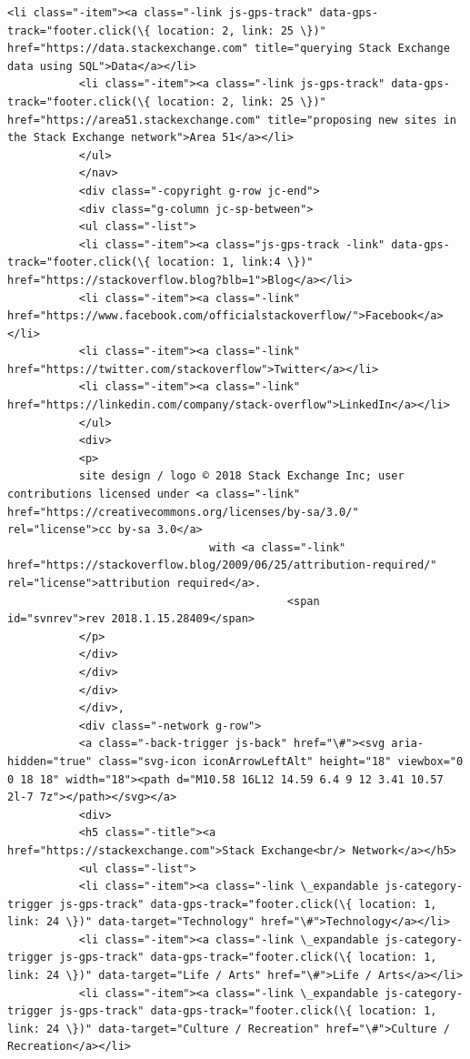 \documentclass[11pt]{article}
\begin{document}
\begin{Verbatim}[commandchars=\\\{\}]
           <li class="-item"><a class="-link js-gps-track" data-gps-track="footer.click(\{ location: 2, link: 25 \})" href="https://data.stackexchange.com" title="querying Stack Exchange data using SQL">Data</a></li>
           <li class="-item"><a class="-link js-gps-track" data-gps-track="footer.click(\{ location: 2, link: 25 \})" href="https://area51.stackexchange.com" title="proposing new sites in the Stack Exchange network">Area 51</a></li>
           </ul>
           </nav>
           <div class="-copyright g-row jc-end">
           <div class="g-column jc-sp-between">
           <ul class="-list">
           <li class="-item"><a class="js-gps-track -link" data-gps-track="footer.click(\{ location: 1, link:4 \})" href="https://stackoverflow.blog?blb=1">Blog</a></li>
           <li class="-item"><a class="-link" href="https://www.facebook.com/officialstackoverflow/">Facebook</a></li>
           <li class="-item"><a class="-link" href="https://twitter.com/stackoverflow">Twitter</a></li>
           <li class="-item"><a class="-link" href="https://linkedin.com/company/stack-overflow">LinkedIn</a></li>
           </ul>
           <div>
           <p>
           site design / logo © 2018 Stack Exchange Inc; user contributions licensed under <a class="-link" href="https://creativecommons.org/licenses/by-sa/3.0/" rel="license">cc by-sa 3.0</a>
                               with <a class="-link" href="https://stackoverflow.blog/2009/06/25/attribution-required/" rel="license">attribution required</a>.
                                           <span id="svnrev">rev 2018.1.15.28409</span>
           </p>
           </div>
           </div>
           </div>
           </div>,
           <div class="-network g-row">
           <a class="-back-trigger js-back" href="\#"><svg aria-hidden="true" class="svg-icon iconArrowLeftAlt" height="18" viewbox="0 0 18 18" width="18"><path d="M10.58 16L12 14.59 6.4 9 12 3.41 10.57 2l-7 7z"></path></svg></a>
           <div>
           <h5 class="-title"><a href="https://stackexchange.com">Stack Exchange<br/> Network</a></h5>
           <ul class="-list">
           <li class="-item"><a class="-link \_expandable js-category-trigger js-gps-track" data-gps-track="footer.click(\{ location: 1, link: 24 \})" data-target="Technology" href="\#">Technology</a></li>
           <li class="-item"><a class="-link \_expandable js-category-trigger js-gps-track" data-gps-track="footer.click(\{ location: 1, link: 24 \})" data-target="Life / Arts" href="\#">Life / Arts</a></li>
           <li class="-item"><a class="-link \_expandable js-category-trigger js-gps-track" data-gps-track="footer.click(\{ location: 1, link: 24 \})" data-target="Culture / Recreation" href="\#">Culture / Recreation</a></li>

\end{Verbatim}
\end{document}
